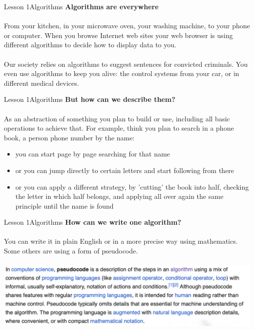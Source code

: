 \documentclass[aspectratio=1610]{beamer}
\begin{document}
\begin{frame}{Lesson 1}{Algorithms}
\Large
\textbf{Algorithms are everywhere}\\~\\ 
From your kitchen, in your microwave oven, your washing machine, to your phone or computer. When you browse Internet web sites your web browser is using different algorithms to decide how to display data to you.\\~\\
Our society relies on algorithms to suggest sentences for convicted criminals. You even use algorithms to keep you alive: the control systems from your car, or in different medical devices.
\end{frame}


\begin{frame}{Lesson 1}{Algorithms}
\Large
\textbf{But how can we describe them?}\\~\\ 
As an abstraction of something you plan to build or use, including all basic operations to achieve that. For example, think you plan to search in a phone book, a person phone number by the name:
\begin{itemize}
    \item you can start page by page searching for that name
    \item or you can jump directly to certain letters and start following from there
    \item or you can apply a different strategy, by 'cutting' the book into half, checking the letter in which half belongs, and applying all over again the same principle until the name is found
\end{itemize}
\end{frame}


\begin{frame}{Lesson 1}{Algorithms}
\Large
\textbf{How can we write one algorithm?}\\~\\ 
You can write it in plain English or in a more precise way using mathematics. Some others are using a form of \alert{pseudocode}.\\~\\
\includegraphics[scale=0.27]{Images/pseudocode}

\end{frame}
\end{document}
